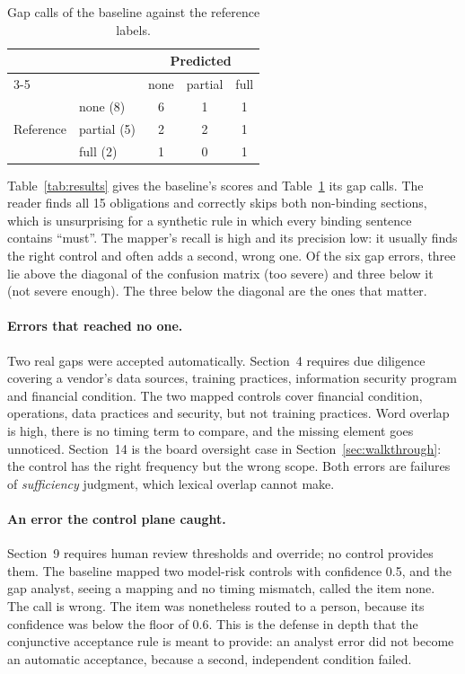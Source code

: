\documentclass[sigconf,review,anonymous]{acmart}
\newcommand{\gapnone}{\textsf{none}}
\newcommand{\gappartial}{\textsf{partial}}
\newcommand{\gapfull}{\textsf{full}}
\begin{document}
\begin{table}[t]
  \caption{Gap calls of the baseline against the reference labels.}
  \label{tab:confusion}
  \small
  \begin{tabular}{@{}llccc@{}}
    \toprule
    & & \multicolumn{3}{c}{Predicted} \\
    \cmidrule(l){3-5}
    & & \gapnone & \gappartial & \gapfull \\
    \midrule
    \multirow{3}{*}{Reference}
      & \gapnone{} (8)    & 6 & 1 & 1 \\
      & \gappartial{} (5) & 2 & 2 & 1 \\
      & \gapfull{} (2)    & 1 & 0 & 1 \\
    \bottomrule
  \end{tabular}
\end{table}

Table~\ref{tab:results} gives the baseline's scores and
Table~\ref{tab:confusion} its gap calls. The reader finds all 15
obligations and correctly skips both non-binding sections, which is
unsurprising for a synthetic rule in which every binding sentence contains
``must''. The mapper's recall is high and its precision low: it usually
finds the right control and often adds a second, wrong one. Of the six gap
errors, three lie above the diagonal of the confusion matrix (too severe)
and three below it (not severe enough). The three below the diagonal are the
ones that matter.

\paragraph{Errors that reached no one.}
Two real gaps were accepted automatically. Section~4 requires due diligence
covering a vendor's data sources, training practices, information security
program and financial condition. The two mapped controls cover financial
condition, operations, data practices and security, but not training
practices. Word overlap is high, there is no timing term to compare, and the
missing element goes unnoticed.
Section~14 is the board oversight case in Section~\ref{sec:walkthrough}:
the control has the right frequency but the wrong scope. Both errors are
failures of \emph{sufficiency} judgment, which lexical overlap cannot make.

\paragraph{An error the control plane caught.}
Section~9 requires human review thresholds and override; no control
provides them. The baseline mapped two model-risk controls with confidence
0.5, and the gap analyst, seeing a mapping and no timing mismatch, called the
item \gapnone{}. The call is wrong. The item was nonetheless routed to a
person, because its confidence was below the floor of 0.6. This is the
defense in depth that the conjunctive acceptance rule is meant to provide:
an analyst error did not become an automatic acceptance, because a second,
independent condition failed.
\end{document}
